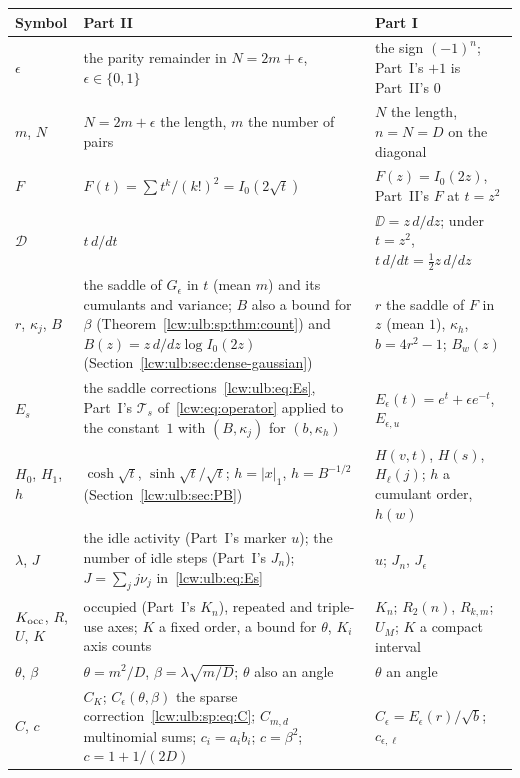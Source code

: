\documentclass[11pt,letterpaper]{article}
\theoremstyle{remark}\newtheorem{remark}[theorem]{Remark}
\newcommand{\TT}{\mathcal T}\newcommand{\PP}{\mathcal P}
\newcommand{\Dop}{\mathcal D}
\begin{document}
\begingroup\small
\renewcommand{\arraystretch}{1.1}
\renewcommand{\theHtable}{lcwulb.notation}%
\begin{longtable}{@{}>{\raggedright\arraybackslash}p{0.95in}>{\raggedright\arraybackslash}p{3.15in}>{\raggedright\arraybackslash}p{2.05in}@{}}
\toprule
Symbol & Part II & Part I\\
\midrule
\endhead
$\epsilon$ & the parity remainder in $N=2m+\epsilon$, $\epsilon\in\{0,1\}$ & the sign $(-1)^n$; Part~I's $+1$ is Part~II's $0$\\
$m$, $N$ & $N=2m+\epsilon$ the length, $m$ the number of pairs & $N$ the length, $n=N=D$ on the diagonal\\
$F$ & $F(t)=\sum t^k/(k!)^2=I_0(2\sqrt t)$ & $F(z)=I_0(2z)$, Part~II's $F$ at $t=z^2$\\
$\Dop$ & $t\,d/dt$ & $\DD=z\,d/dz$; under $t=z^2$, $t\,d/dt=\tfrac12z\,d/dz$\\
$r$, $\kappa_j$, $B$ & the saddle of $G_\epsilon$ in $t$ (mean $m$) and its cumulants and variance; $B$ also a bound for $\beta$ (Theorem~\ref{lcw:ulb:sp:thm:count}) and $B(z)=z\,d/dz\log I_0(2z)$ (Section~\ref{lcw:ulb:sec:dense-gaussian}) & $r$ the saddle of $F$ in $z$ (mean $1$), $\kappa_h$, $b=4r^2-1$; $B_w(z)$\\
$E_s$ & the saddle corrections~\eqref{lcw:ulb:eq:Es}, Part~I's $\TT_s$ of~\eqref{lcw:eq:operator} applied to the constant~$1$ with $(B,\kappa_j)$ for $(b,\kappa_h)$ & $E_\epsilon(t)=e^t+\epsilon e^{-t}$, $E_{\epsilon,u}$\\
$H_0$, $H_1$, $h$ & $\cosh\sqrt t$, $\sinh\sqrt t/\sqrt t$; $h=|x|_1$, $h=B^{-1/2}$ (Section~\ref{lcw:ulb:sec:PB}) & $H(v,t)$, $H(s)$, $H_\ell(j)$; $h$ a cumulant order, $h(w)$\\
$\lambda$, $J$ & the idle activity (Part~I's marker $u$); the number of idle steps (Part~I's $J_n$); $J=\sum_jj\nu_j$ in~\eqref{lcw:ulb:eq:Es} & $u$; $J_n$, $J_\epsilon$\\
$K_{\rm occ}$, $R$, $U$, $K$ & occupied (Part~I's $K_n$), repeated and triple-use axes; $K$ a fixed order, a bound for $\theta$, $K_i$ axis counts & $K_n$; $R_2(n)$, $R_{k,m}$; $U_M$; $K$ a compact interval\\
$\theta$, $\beta$ & $\theta=m^2/D$, $\beta=\lambda\sqrt{m/D}$; $\theta$ also an angle & $\theta$ an angle\\
$C$, $c$ & $C_K$; $C_\epsilon(\theta,\beta)$ the sparse correction~\eqref{lcw:ulb:sp:eq:C}; $C_{m,d}$ multinomial sums; $c_i=a_ib_i$; $c=\beta^2$; $c=1+1/(2D)$ & $C_\epsilon=E_\epsilon(r)/\sqrt b$; $c_{\epsilon,\ell}$\\

\end{longtable}
\end{document}
